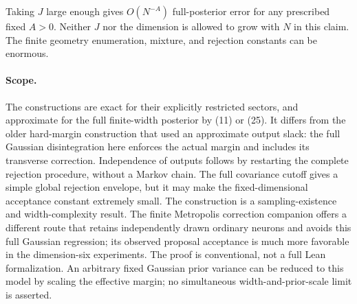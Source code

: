 \documentclass[11pt]{article}
\begin{document}
Taking $J$ large enough gives $O(N^{-A})$ full-posterior error for any
prescribed fixed $A>0$. Neither $J$ nor the dimension is allowed to grow
with $N$ in this claim. The finite geometry enumeration, mixture, and
rejection constants can be enormous.

\paragraph{Scope.}
The constructions are exact for their explicitly restricted sectors,
and approximate for the full finite-width posterior by (11) or (25). It differs from
the older hard-margin construction that used an approximate output slack:
the full Gaussian disintegration here enforces the actual margin and
includes its transverse correction. Independence of outputs follows by
restarting the complete rejection procedure, without a Markov chain.
The full covariance cutoff gives a simple global rejection envelope,
but it may make the fixed-dimensional acceptance constant extremely
small. The construction is a sampling-existence and width-complexity
result. The finite Metropolis correction companion offers a different
route that retains independently drawn ordinary neurons and avoids this
full Gaussian regression; its observed proposal acceptance is much more
favorable in the dimension-six experiments.
The proof is conventional, not a full Lean formalization. An arbitrary
fixed Gaussian prior variance can be reduced to this model by scaling
the effective margin; no simultaneous width-and-prior-scale limit is
asserted.
\end{document}

